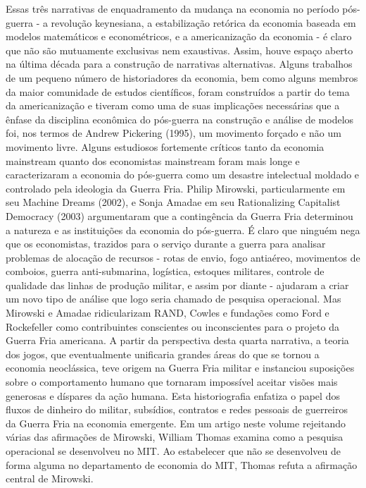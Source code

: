 \documentclass[12pt]{article}
\begin{document}
Essas três narrativas de enquadramento da mudança na economia no período pós-guerra - a revolução keynesiana, a estabilização retórica da economia baseada em modelos matemáticos e econométricos, e a americanização da economia - é claro que não são mutuamente exclusivas nem exaustivas. Assim, houve espaço aberto na última década para a construção de narrativas alternativas. Alguns trabalhos de um pequeno número de historiadores da economia, bem como alguns membros da maior comunidade de estudos científicos, foram construídos a partir do tema da americanização e tiveram como uma de suas implicações necessárias que a ênfase da disciplina econômica do pós-guerra na construção e análise de modelos foi, nos termos de Andrew Pickering (1995), um movimento forçado e não um movimento livre. Alguns estudiosos fortemente críticos tanto da economia mainstream quanto dos economistas mainstream foram mais longe e caracterizaram a economia do pós-guerra como um desastre intelectual moldado e controlado pela ideologia da Guerra Fria. Philip Mirowski, particularmente em seu Machine Dreams (2002), e Sonja Amadae em seu Rationalizing Capitalist Democracy (2003) argumentaram que a contingência da Guerra Fria determinou a natureza e as instituições da economia do pós-guerra. É claro que ninguém nega que os economistas, trazidos para o serviço durante a guerra para analisar problemas de alocação de recursos - rotas de envio, fogo antiaéreo, movimentos de comboios, guerra anti-submarina, logística, estoques militares, controle de qualidade das linhas de produção militar, e assim por diante - ajudaram a criar um novo tipo de análise que logo seria chamado de pesquisa operacional. Mas Mirowski e Amadae ridicularizam RAND, Cowles e fundações como Ford e Rockefeller como contribuintes conscientes ou inconscientes para o projeto da Guerra Fria americana. A partir da perspectiva desta quarta narrativa, a teoria dos jogos, que eventualmente unificaria grandes áreas do que se tornou a economia neoclássica, teve origem na Guerra Fria militar e instanciou suposições sobre o comportamento humano que tornaram impossível aceitar visões mais generosas e díspares da ação humana. Esta historiografia enfatiza o papel dos fluxos de dinheiro do militar, subsídios, contratos e redes pessoais de guerreiros da Guerra Fria na economia emergente. Em um artigo neste volume rejeitando várias das afirmações de Mirowski, William Thomas examina como a pesquisa operacional se desenvolveu no MIT. Ao estabelecer que não se desenvolveu de forma alguma no departamento de economia do MIT, Thomas refuta a afirmação central de Mirowski.
\end{document}
